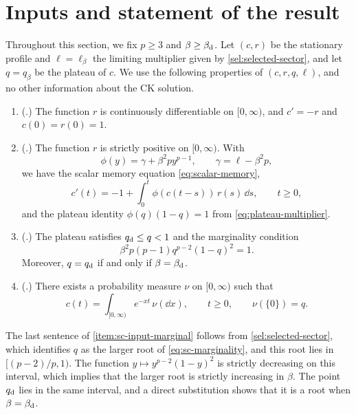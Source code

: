 \section{Inputs and statement of the result}\label{sec:sc-statement}

Throughout this section, we fix $p\ge3$ and $\beta\ge\beta_{\mathrm d}$. Let $(c,r)$ be the stationary profile and $\ell=\ell_\beta$ the limiting multiplier given by \cref{sel:selected-sector}, and let $q=q_\beta$ be the plateau of $c$. We use the following properties of $(c,r,q,\ell)$, and no other information about the CK solution.
\begin{enumerate}[label=(S\arabic*)]
\item\label{item:sc-input-regularity} (.) The function $r$ is continuously differentiable on $[0,\infty)$, and $c'=-r$ and $c(0)=r(0)=1$.
\item\label{item:sc-input-scalar} (.) The function $r$ is strictly positive on $[0,\infty)$. With
\[
 \phi(y)=\gamma+\beta^2py^{p-1},\qquad \gamma=\ell-\beta^2p,
\]
we have the scalar memory equation \eqref{eq:scalar-memory},
\[
 c'(t)=-1+\int_0^t\phi(c(t-s))\,r(s)\,\dd s,\qquad t\ge0,
\]
and the plateau identity $\phi(q)(1-q)=1$ from \eqref{eq:plateau-multiplier}.
\item\label{item:sc-input-marginal} (.) The plateau satisfies $q_{\mathrm d}\le q<1$ and the marginality condition
\begin{equation}\label{eq:sc-marginality}
 \beta^2p(p-1)q^{p-2}(1-q)^2=1.
\end{equation}
Moreover, $q=q_{\mathrm d}$ if and only if $\beta=\beta_{\mathrm d}$.
\item\label{item:sc-input-cm} (.) There exists a probability measure $\nu$ on $[0,\infty)$ such that
\[
 c(t)=\int_{[0,\infty)}e^{-xt}\,\nu(\dd x),\qquad t\ge0,\qquad\nu(\{0\})=q.
\]
\end{enumerate}
The last sentence of \ref{item:sc-input-marginal} follows from \cref{sel:selected-sector}, which identifies $q$ as the larger root of \eqref{eq:sc-marginality}, and this root lies in $[(p-2)/p,1)$. The function $y\mapsto y^{p-2}(1-y)^2$ is strictly decreasing on this interval, which implies that the larger root is strictly increasing in $\beta$. The point $q_{\mathrm d}$ lies in the same interval, and a direct substitution shows that it is a root when $\beta=\beta_{\mathrm d}$.

